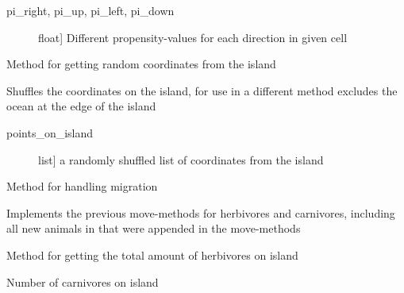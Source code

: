 \documentclass[a4paper,10pt,english]{sphinxmanual}
\begin{document}
\begin{fulllineitems}
\begin{fulllineitems}
\begin{description}
\end{description}
\begin{description}
\item[{pi\_right, pi\_up, pi\_left, pi\_down}] \leavevmode{[}float{]}
Different propensity-values for each direction in given cell

\end{description}

\end{fulllineitems}


\begin{fulllineitems}
\label{\detokenize{island:biosim.island.Island.get_random_coordinates}}
Method for getting random coordinates from the island

Shuffles the coordinates on the island, for use in a different method
excludes the ocean at the edge of the island
\begin{description}
\item[{points\_on\_island}] \leavevmode{[}list{]}
a randomly shuffled list of coordinates from the island

\end{description}

\end{fulllineitems}


\begin{fulllineitems}
\label{\detokenize{island:biosim.island.Island.migration}}
Method for handling migration

Implements the previous move-methods for herbivores and carnivores,
including all new animals in that were appended in the move-methods

\end{fulllineitems}


\begin{fulllineitems}
\label{\detokenize{island:biosim.island.Island.number_of_carnivores_island}}
Method for getting the total amount of herbivores on island

Number of carnivores on island


\end{fulllineitems}
\end{fulllineitems}
\end{document}
